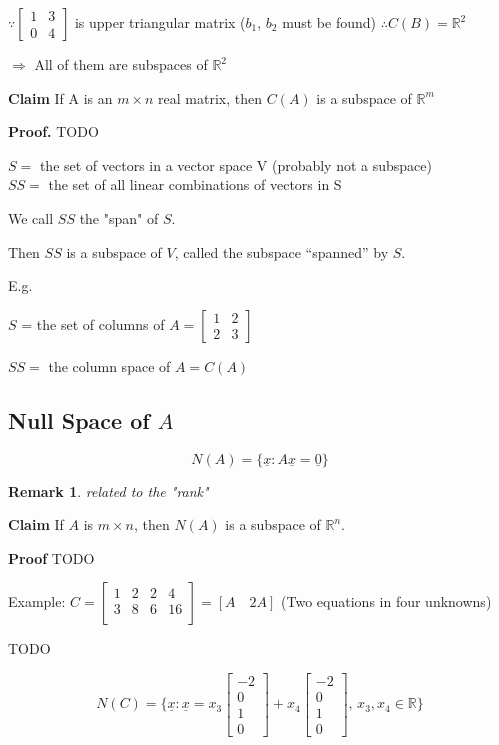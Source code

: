 \documentclass[12pt,a4paper]{article}
\newtheorem*{rem}{Remark}
\newcommand{\Remark}[1]{
  \begin{rem}
    \color{cyan}
    #1
  \end{rem}
}
\begin{document}
$
\because
\begin{bmatrix}
  1 & 3 \\
  0 & 4
\end{bmatrix}
$ is upper triangular matrix ($b_1$, $b_2$ must be found)
$\therefore C(B) = \mathbb{R}^2$

$\Rightarrow$ All of them are subspaces of $\mathbb{R}^2$

\textbf{Claim} If A is an $m \times n$ real matrix, then $C(A)$ is a subspace of $\mathbb{R}^m$

\textbf{Proof.} TODO

$S = $ the set of vectors in a vector space V (probably not a subspace) \\
$SS =$ the set of all linear combinations of vectors in S

We call $SS$ the "span" of $S$.

Then $SS$ is a subspace of $V$, called the subspace ``spanned'' by $S$.

E.g.

$S$ = the set of columns of 
$
A = 
\begin{bmatrix}
  1 & 2 \\
  2 & 3
\end{bmatrix}
$

$SS = $ the column space of $A = C(A)$

\subsection*{Null Space of $A$}

$$N(A) = \{\underline{x}: A\underline{x} = \underline{0}\}$$

\Remark{related to the "rank"}

\textbf{Claim} If $A$ is $m \times n$, then $N(A)$ is a subspace of $\mathbb{R}^n$.

\textbf{Proof} TODO

Example:
$
C = 
\begin{bmatrix}
  1 & 2 & 2 & 4 \\
  3 & 8 & 6 & 16 \\
\end{bmatrix} = [A \quad 2A]
$ (Two equations in four unknowns)

TODO

\[
  N(C) = \{ \underline{x}: \underline{x} = 
    x_3
    \begin{bmatrix}
      -2 \\
      0 \\
      1 \\
      0
    \end{bmatrix} + 
    x_4
    \begin{bmatrix}
      -2 \\
      0 \\
      1 \\
      0
    \end{bmatrix},\, x_3, x_4 \in \mathbb{R}
  \} 
\]
\end{document}
